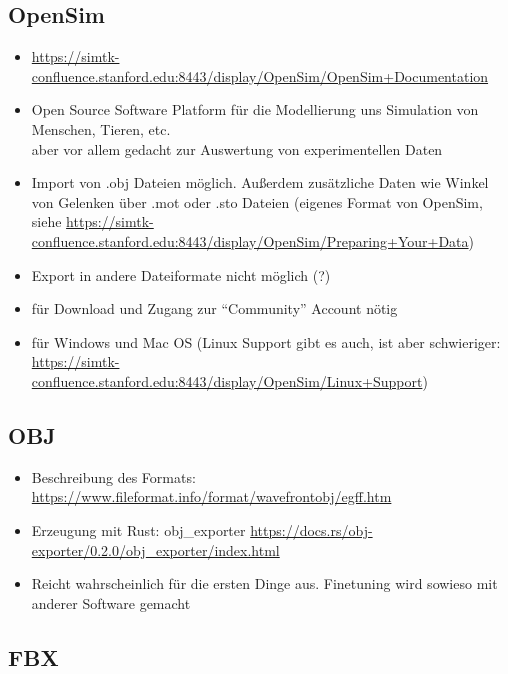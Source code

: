 \subsection{OpenSim}

\begin{itemize}
 \item \url{https://simtk-confluence.stanford.edu:8443/display/OpenSim/OpenSim+Documentation}
 \item Open Source Software Platform für die Modellierung uns Simulation von Menschen, Tieren, etc.\\
 aber vor allem gedacht zur Auswertung von experimentellen Daten
 \item Import von .obj Dateien möglich. Außerdem zusätzliche Daten wie Winkel von Gelenken über .mot oder .sto Dateien (eigenes Format von OpenSim, siehe \url{https://simtk-confluence.stanford.edu:8443/display/OpenSim/Preparing+Your+Data})
 \item Export in andere Dateiformate nicht möglich (?)
 \item für Download und Zugang zur "`Community"' Account nötig
 \item für Windows und Mac OS (Linux Support gibt es auch, ist aber schwieriger: \url{https://simtk-confluence.stanford.edu:8443/display/OpenSim/Linux+Support})
\end{itemize}


\subsection{OBJ}

\begin{itemize}
 \item Beschreibung des Formats: \url{https://www.fileformat.info/format/wavefrontobj/egff.htm}
 \item Erzeugung mit Rust: obj\_exporter \url{https://docs.rs/obj-exporter/0.2.0/obj_exporter/index.html}
 \item Reicht wahrscheinlich für die ersten Dinge aus. Finetuning wird sowieso mit anderer Software gemacht
\end{itemize}

\subsection{FBX}

